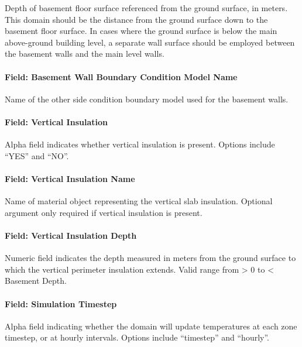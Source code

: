 Depth of basement floor surface referenced from the ground surface, in meters. This domain should be the distance from the ground surface down to the basement floor surface. In cases where the ground surface is below the main above-ground building level, a separate wall surface should be employed between the basement walls and the main level walls.

\paragraph{Field: Basement Wall Boundary Condition Model Name}\label{field-basement-wall-boundary-condition-model-name}

Name of the other side condition boundary model used for the basement walls.

\paragraph{Field: Vertical Insulation}\label{field-vertical-insulation-1}

Alpha field indicates whether vertical insulation is present. Options include ``YES'' and ``NO''.

\paragraph{Field: Vertical Insulation Name}\label{field-vertical-insulation-name-1}

Name of material object representing the vertical slab insulation. Optional argument only required if vertical insulation is present.

\paragraph{Field: Vertical Insulation Depth}\label{field-vertical-insulation-depth-1}

Numeric field indicates the depth measured in meters from the ground surface to which the vertical perimeter insulation extends. Valid range from \textgreater{} 0 to \textless{} Basement Depth.

\paragraph{Field: Simulation Timestep}\label{field-simulation-timestep-1}

Alpha field indicating whether the domain will update temperatures at each zone timestep, or at hourly intervals. Options include ``timestep'' and ``hourly''.


